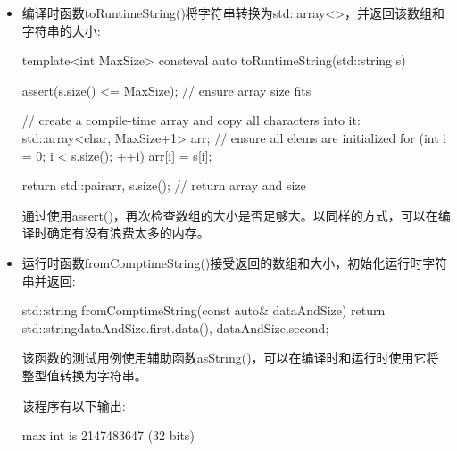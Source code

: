 \begin{itemize}
\item 
编译时函数toRuntimeString()将字符串转换为std::array<>，并返回该数组和字符串的大小:

\begin{cpp}
template<int MaxSize>
consteval auto toRuntimeString(std::string s)
{
	assert(s.size() <= MaxSize); // ensure array size fits
	
	// create a compile-time array and copy all characters into it:
	std::array<char, MaxSize+1> arr{}; // ensure all elems are initialized
	for (int i = 0; i < s.size(); ++i) {
		arr[i] = s[i];
	}
	
	return std::pair{arr, s.size()}; // return array and size
}
\end{cpp}

通过使用assert()，再次检查数组的大小是否足够大。以同样的方式，可以在编译时确定有没有浪费太多的内存。

\item 
运行时函数fromComptimeString()接受返回的数组和大小，初始化运行时字符串并返回:

\begin{cpp}
std::string fromComptimeString(const auto& dataAndSize)
{
	return std::string{dataAndSize.first.data(),
					   dataAndSize.second};
}
\end{cpp}

该函数的测试用例使用辅助函数asString()，可以在编译时和运行时使用它将整型值转换为字符串。

该程序有以下输出:

\begin{shell}
max int is 2147483647 (32 bits)
\end{shell}

\end{itemize}






